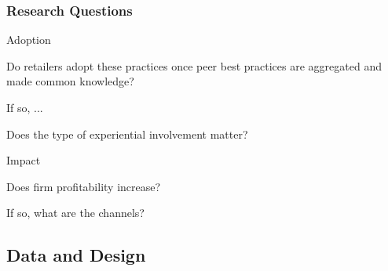 \documentclass[hideothersubsections, usenames,dvipsnames,10pt]{beamer}
\newenvironment{itemize_3pt}{\itemize\addtolength{\itemsep}{3pt}}{\enditemize}
\begin{document}
\begin{frame}
\frametitle{Research Questions}
	\begin{itemize_3pt}
	\item \textcolor{bdf}{Adoption}
		\begin{itemize_3pt}
		\item Do retailers adopt these practices once peer best practices are aggregated and made common knowledge?
		\item If so, ...
			\begin{itemize_3pt}
			\item Does the type of experiential involvement matter?
			\end{itemize_3pt}
		\end{itemize_3pt}
    \vspace{0.3in}
	\item \textcolor{bdf}{Impact}
		\begin{itemize_3pt}
		\item Does firm profitability increase?
		\item If so, what are the channels?
		\end{itemize_3pt}
	\end{itemize_3pt}
\end{frame}

\subsection{Data and Design}
\end{document}

